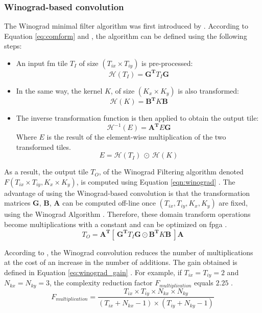 \subsubsection{Winograd-based convolution}
%
The Winograd minimal filter algorithm was first introduced by \textcite{winograd_arithmetic_1980}. According to Equation \eqref{eq:comform} and \textcite{abdelouahab_accelerating_2018}, the algorithm can be defined using the following steps:
\begin{itemize}
    \item An input \acrshort{fm} tile $T_I$ of size $(T_{ix} \times T_{iy})$ is pre-processed: $$\mathcal{H}(T_I) = \boldsymbol{G^{T}} T_I \boldsymbol{G} $$
    \item In the same way, the kernel $K$, of size $(K_x \times K_y)$ is also transformed: $$\mathcal{H}(K) = \boldsymbol{B^{T}} K \boldsymbol{B}$$
    \item The inverse transformation function is then applied to obtain the output tile: $$\mathcal{H}^{-1}(E) = \boldsymbol{A^{T}} E \boldsymbol{G}$$ Where $E$ is the result of the element-wise multiplication of the two transformed tiles. $$ E = \mathcal{H}(T_I) \ \odot \ \mathcal{H}(K) $$
\end{itemize}
As a result, the output tile $T_O$, of the Winograd Filtering algorithm denoted $F(T_{ix} \times T_{iy}, K_x \times K_y)$, is computed using Equation \eqref{eqn:winograd} \cite{winograd_arithmetic_1980}. The advantage of using the Winograd-based convolution is that the transformation matrices $\boldsymbol{G}$, $\boldsymbol{B}$, $\boldsymbol{A}$ can be computed off-line once $(T_{ix}, T_{iy}, K_x, K_y)$ are fixed, using the Winograd Algorithm \cite{winograd_arithmetic_1980}. Therefore, these domain transform operations become multiplications with a constant and can be optimized on \acrshort{fpga} \cite{liang_evaluating_2020}.
%
\begin{equation}
    T_O = \boldsymbol{A^{T}} [ \ \boldsymbol{G^{T}} T_I \boldsymbol{G} \odot \boldsymbol{B^{T}} K\boldsymbol{B} \ ] \boldsymbol{A}
    \label{eqn:winograd}
\end{equation}

According to \textcite{winograd_arithmetic_1980}, the Winograd convolution reduces the number of multiplications at the cost of an increase in the number of additions. The gain obtained is defined in Equation \eqref{eq:winograd_gain} \cite{winograd_arithmetic_1980}. For example, if $T_{ix} = T_{iy} = 2$ and $N_{kx} = N_{ky} = 3$, the complexity reduction factor $F_{multiplication}$ equals $2.25$ \cite{lavin_fast_2016}.
%
\begin{equation}
    F_{multiplication} = \frac{T_{ix} \times T_{iy} \times N_{kx} \times N_{ky}}{(T_{ix} + N_{kx} - 1) \times (T_{iy} + N_{ky} - 1)}
    \label{eq:winograd_gain}
\end{equation}
%
